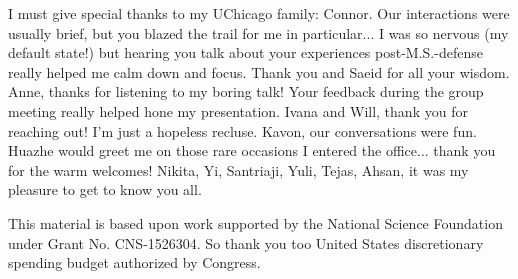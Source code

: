 I must give special thanks to my UChicago family: Connor. Our interactions were
usually brief, but you blazed the trail for me in particular... I was so nervous
(my default state!) but hearing you talk about your experiences
post-M.S.-defense really helped me calm down and focus. Thank you and Saeid for
all your wisdom. Anne, thanks for listening to my boring talk! Your feedback
during the group meeting really helped hone my presentation. Ivana and Will,
thank you for reaching out! I'm just a hopeless recluse. Kavon, our
conversations were fun. Huazhe would greet me on those rare occasions I entered
the office... thank you for the warm welcomes! Nikita, Yi, Santriaji, Yuli,
Tejas, Ahsan, it was my pleasure to get to know you all.

This material is based upon work supported by the National Science Foundation
under Grant No. CNS-1526304. So thank you too United States discretionary
spending budget authorized by Congress.
